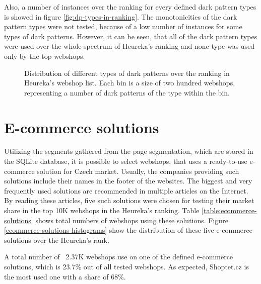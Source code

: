 Also, a number of instances over the ranking for every defined dark pattern types is showed in figure \ref{fig:dp-types-in-ranking}. The monotonicities of the dark pattern types were not tested, because of a low number of instances for some types of dark patterns. However, it can be seen, that all of the dark pattern types were used over the whole spectrum of Heureka's ranking and none type was used only by the top webshops.

\begin{figure}
    \begin{center}
        
    \end{center}
    \caption{Distribution of different types of dark patterns over the ranking in Heureka's webshop list. Each bin is a size of two hundred webshops, representing a number of dark patterns of the type within the bin.}
\end{figure}

\section{E-commerce solutions}
Utilizing the segments gathered from the page segmentation, which are stored in the SQLite database, it is possible to select webshops, that uses a ready-to-use e-commerce solution for Czech market. Usually, the companies providing such solutions include their names in the footer of the websites. The biggest and very frequently used solutions are recommended in multiple articles on the Internet\cite{5nej}\cite{lupacz}\cite{nastrojeproweb}\cite{entuzio}\cite{compari}. By reading these articles, five such solutions were chosen for testing their market share in the top 10K webshops in the Heureka's ranking. Table \ref{table:ecommerce-solutions} shows total numbers of webshops using these solutions. Figure \ref{ecommerce-solutions-histograms} show the distribution of these five e-commerce solutions over the Heureka's rank. 

A total number of ~2.37K webshops use on one of the defined e-commerce solutions, which is 23.7\% out of all tested webshops. As expected, Shoptet.cz is the most used one with a share of 68\%.

